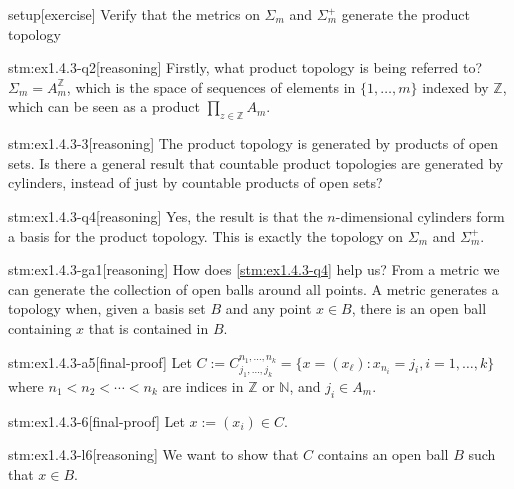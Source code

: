 
\begin{stm}{setup}[exercise]
Verify that the metrics on $\Sigma_m$ and $\Sigma_m^+$ generate the product topology
\end{stm}


\begin{stm}{stm:ex1.4.3-q2}[reasoning]
Firstly, what product topology is being referred to? $\Sigma_m = A_m^{\mathbb{Z}}$, which is the space of sequences of elements in $\{1,\ldots,m\}$ indexed by $\mathbb{Z}$, which can be seen as a product $\prod_{z \in \mathbb{Z}} A_m$.
\end{stm}

\begin{stm}{stm:ex1.4.3-3}[reasoning]
The product topology is generated by products of open sets. Is there a general result that countable product topologies are generated by cylinders, instead of just by countable products of open sets?
\end{stm}

\begin{stm}{stm:ex1.4.3-q4}[reasoning]
Yes, the result is that the $n$-dimensional cylinders form a basis for the product topology. This is exactly the topology on $\Sigma_m$ and $\Sigma_m^+$.
\end{stm}

\begin{stm}{stm:ex1.4.3-ga1}[reasoning]
How does \ref{stm:ex1.4.3-q4} help us? From a metric we can generate the collection of open balls around all points. A metric generates a topology when, given a basis set $B$ and any point $x \in B$, there is an open ball containing $x$ that is contained in $B$.
\end{stm}

\begin{stm}{stm:ex1.4.3-a5}[final-proof]
Let $C := C_{j_1,\ldots,j_k}^{n_1,\ldots,n_k} = \{ x = (x_\ell) : x_{n_i} = j_i, i=1,\ldots,k \}$ where $n_1 < n_2 < \cdots < n_k$ are indices in $\mathbb{Z}$ or $\mathbb{N}$, and $j_i \in A_m$.
\end{stm}

\begin{stm}{stm:ex1.4.3-6}[final-proof]
    Let $x := (x_i)  \in C$.
\end{stm}

\begin{stm}{stm:ex1.4.3-l6}[reasoning]
We want to show that $C$ contains an open ball $B$ such that $x \in B$.
\end{stm}

